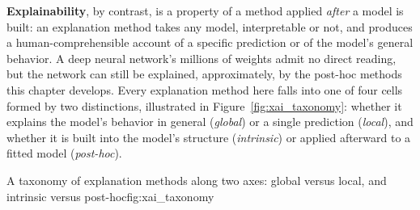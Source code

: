 \documentclass[../ai_in_finance]{subfiles}
\begin{document}
\textbf{Explainability}, by contrast, is a property of a method applied \emph{after} a model is built: an explanation method takes any model, interpretable or not, and produces a human-comprehensible account of a specific prediction or of the model's general behavior. A deep neural network's millions of weights admit no direct reading, but the network can still be explained, approximately, by the post-hoc methods this chapter develops. Every explanation method here falls into one of four cells formed by two distinctions, illustrated in Figure~\ref{fig:xai_taxonomy}: whether it explains the model's behavior in general (\emph{global}) or a single prediction (\emph{local}), and whether it is built into the model's structure (\emph{intrinsic}) or applied afterward to a fitted model (\emph{post-hoc}).

\begin{bookfigure}[htbp]{A taxonomy of explanation methods along two axes: global versus local, and intrinsic versus post-hoc}{fig:xai_taxonomy}
\end{bookfigure}
\end{document}
